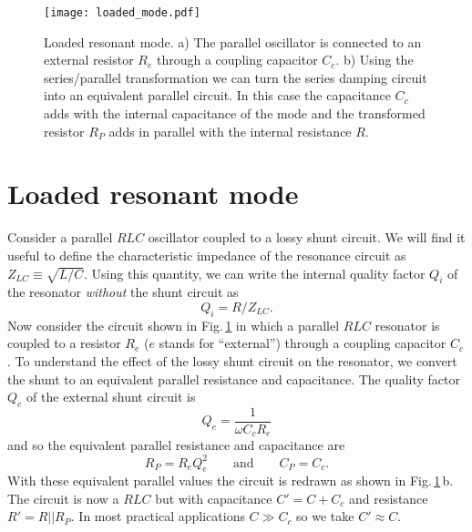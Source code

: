 \begin{figure}
\begin{centering}
\texttt{[image: loaded\_mode.pdf]} 
\par\end{centering}
\caption{Loaded resonant mode.
a) The parallel oscillator is connected to an external resistor $R_e$ through a coupling capacitor $C_c$.
b) Using the series/parallel transformation we can turn the series damping circuit into an equivalent parallel circuit.
In this case the capacitance $C_c$ adds with the internal capacitance of the mode and the transformed resistor $R_P$ adds in parallel with the internal resistance $R$.}
\label{Fig:loadedMode}
\end{figure}

\section{Loaded resonant mode}

Consider a parallel $RLC$ oscillator coupled to a lossy shunt circuit.
We will find it useful to define the characteristic impedance of the resonance circuit as $Z_{LC} \equiv \sqrt{L/C}$.
Using this quantity, we can write the internal quality factor $Q_i$ of the resonator \emph{without} the shunt circuit as
\begin{equation}
Q_i = R/Z_{LC} . \end{equation}
Now consider the circuit shown in Fig.\,\ref{Fig:loadedMode} in which a parallel $RLC$ resonator is coupled to a resistor $R_e$ ($e$ stands for ``external'') through a coupling capacitor $C_c$.
To understand the effect of the lossy shunt circuit on the resonator, we convert the shunt to an equivalent parallel resistance and capacitance.
The quality factor $Q_e$ of the external shunt circuit is \begin{equation}
Q_e = \frac{1}{\omega C_c R_e} \end{equation}
and so the equivalent parallel resistance and capacitance are \begin{equation}
R_P = R_e Q_e^2 \qquad \text{and} \qquad C_P = C_c  . \end{equation}
With these equivalent parallel values the circuit is redrawn as shown in Fig.\,\ref{Fig:loadedMode}\,b.
The circuit is now a $RLC$ but with capacitance $C' = C + C_c$ and resistance $R'= R||R_P$.
In most practical applications $C \gg C_c$ so we take $C' \approx C$.

